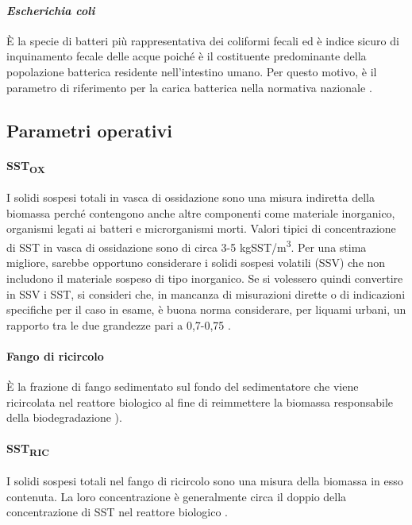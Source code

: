 \paragraph*{\textit{Escherichia coli}}
\`E la specie di batteri più rappresentativa dei coliformi fecali ed è indice sicuro di inquinamento fecale delle acque poiché è il costituente predominante della popolazione batterica residente nell'intestino umano. Per questo motivo, è il parametro di riferimento per la carica batterica nella normativa nazionale \cite{bonomo2008trattamenti}.

\subsection{Parametri operativi}
\label{subsec:par_op_th}
\paragraph*{SST\textsubscript{OX}}
I solidi sospesi totali in vasca di ossidazione sono una misura indiretta della biomassa perché contengono anche altre componenti come materiale inorganico, organismi legati ai batteri e microrganismi morti. Valori tipici di concentrazione di SST in vasca di ossidazione sono di circa 3-5 kgSST/m\textsuperscript{3}. Per una stima migliore, sarebbe opportuno considerare i solidi sospesi volatili (SSV) che non includono il materiale sospeso di tipo inorganico. Se si volessero quindi convertire in SSV i SST, si consideri che, in mancanza di misurazioni dirette o di indicazioni specifiche per il caso in esame, è buona norma considerare, per liquami urbani, un rapporto tra le due grandezze pari a 0,7-0,75 \cite{bonomo2008trattamenti}. 
\paragraph*{Fango di ricircolo}
\`E la frazione di fango sedimentato sul fondo del sedimentatore che viene ricircolata nel reattore biologico al fine di reimmettere la biomassa responsabile della biodegradazione \cite{collivignarelli2012ingegneria}).
\paragraph*{SST\textsubscript{RIC}}
I solidi sospesi totali nel fango di ricircolo sono una misura della biomassa in esso contenuta. La loro concentrazione è generalmente circa il doppio della concentrazione di SST nel reattore biologico \cite{collivignarelli2012ingegneria}.
